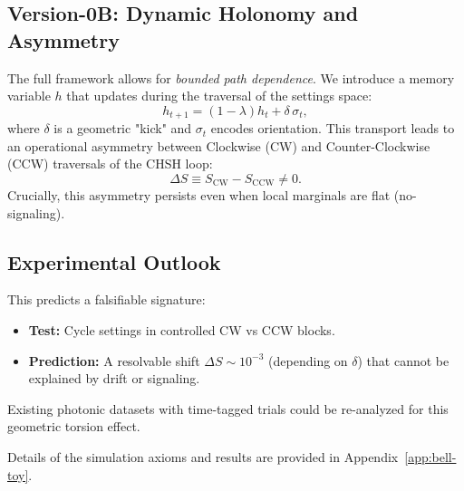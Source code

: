 \subsection{Version-0B: Dynamic Holonomy and Asymmetry}
The full framework allows for \emph{bounded path dependence}. We introduce a memory variable $h$ that updates during the traversal of the settings space:
\begin{equation}\label{eq:hupdate}
h_{t+1} = (1-\lambda)h_t + \delta\,\sigma_t,
\end{equation}
where $\delta$ is a geometric "kick" and $\sigma_t$ encodes orientation.
This transport leads to an operational asymmetry between Clockwise (CW) and Counter-Clockwise (CCW) traversals of the CHSH loop:
\begin{equation}
\Delta S \equiv S_{\mathrm{CW}} - S_{\mathrm{CCW}} \neq 0.
\end{equation}
Crucially, this asymmetry persists even when local marginals are flat (no-signaling).

\subsection{Experimental Outlook}
This predicts a falsifiable signature:
\begin{itemize}
    \item \textbf{Test:} Cycle settings in controlled CW vs CCW blocks.
    \item \textbf{Prediction:} A resolvable shift $\Delta S \sim 10^{-3}$ (depending on $\delta$) that cannot be explained by drift or signaling.
\end{itemize}
Existing photonic datasets with time-tagged trials could be re-analyzed for this geometric torsion effect.

Details of the simulation axioms and results are provided in Appendix~\ref{app:bell-toy}.
